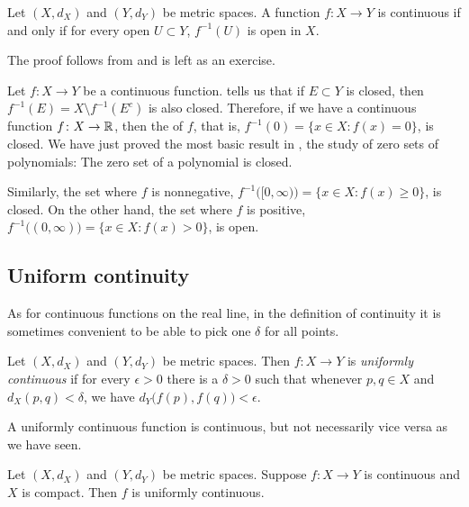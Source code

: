 \begin{thm} \label{thm:mstopocont}
Let $(X,d_X)$ and $(Y,d_Y)$ be metric spaces.  A function $f \colon X \to Y$
is continuous if and only if
for every open $U \subset Y$, $f^{-1}(U)$ is open in $X$.
\end{thm}

The proof follows from  and is left as
an exercise.

\begin{example}
Let $f \colon X \to Y$ be a continuous function.
 tells us that if $E \subset Y$ is closed, then 
$f^{-1}(E) = X \setminus f^{-1}(E^c)$ is also closed.  Therefore, if
we have a continuous
function $f \colon X \to {\mathbb{R}}$, then the
\emph{} of $f$, that is, 
$f^{-1}(0) = \bigl\{ x \in X : f(x) = 0 \bigr\}$, is closed.
We have just proved the most basic result in
\emph{}, the study of
zero sets of polynomials:  The zero set of a polynomial is closed.

Similarly, the set where $f$ is nonnegative,
$f^{-1}\bigl( [0,\infty) \bigr) = \bigl\{ x \in X : f(x) \geq 0 \bigr\}$,
is closed.  On the other hand, the
set where $f$ is positive,
$f^{-1}\bigl( (0,\infty) \bigr) = \bigl\{ x \in X : f(x) > 0 \bigr\}$,
is open.  
\end{example}

\subsection{Uniform continuity}

As for continuous
functions on the real line, in the definition of continuity
it is sometimes convenient to be able to pick
one $\delta$ for all points.

\begin{defn}
Let $(X,d_X)$ and $(Y,d_Y)$ be metric spaces.
Then $f \colon X \to Y$ is
\emph{uniformly continuous}
if for every $\epsilon > 0$
there is a $\delta > 0$ such that whenever $p,q \in X$ and $d_X(p,q) <
\delta$, we have
$d_Y\bigl(f(p),f(q)\bigr) < \epsilon$.
\end{defn}

A uniformly continuous function is continuous, but not necessarily
vice versa as we have seen.

\begin{thm} \label{thm:Xcompactfunifcont}
Let $(X,d_X)$ and $(Y,d_Y)$ be metric spaces.
Suppose $f \colon X \to Y$ is continuous and $X$ is compact.  Then
$f$ is uniformly continuous.
\end{thm}

